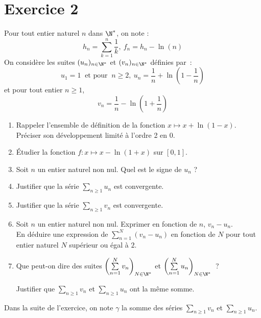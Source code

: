 \documentclass[twoside,french,11pt]{VcCours}
\begin{document}
\section*{Exercice 2}
Pour tout entier naturel $n$ dans $\N^*$, on note :
\[h_n=\sum_{k=1}^n\frac{1}{k},\ f_n=h_n-\ln(n)\]
On considère les suites $(u_n)_{n\in\N^*}$ et $(v_n)_{n\in \N^*}$ définies par~:
$$ u_1=1\ \textrm{ et pour }\ n\geq 2,\ u_n=\frac{1}{n}+\ln \left(1-\frac{1}{n}\right)$$
et pour tout entier $n \geq 1$, 
$$ v_n=\frac{1}{n}-\ln \left(1+\frac{1}{n}\right)$$
\begin{enumerate}
\item Rappeler l'ensemble de définition de la fonction $x\mapsto x+\ln(1-x)$. Préciser son développement limité à l'ordre 2 en 0.
\item Étudier la fonction $f :  x\mapsto x-\ln(1+x)$ sur $[0,1]$.
\item Soit $n$ un entier naturel non nul. Quel est le signe de $u_n$ ? 
\item Justifier que la série $\sum_{n\geq 1} u_n$ est convergente.
\item Justifier que la série $\sum_{n\geq 1} v_n$ est convergente.
\item Soit $n$ un entier naturel non nul. Exprimer en fonction de $n$, $v_n-u_n$.\\
En déduire une expression de $\sum\limits_{n=1}^N(v_n-u_n)$ en fonction de $N$ pour tout entier naturel $N$ supérieur ou égal à $2$.
\item Que peut-on dire des suites $\left(\sum\limits_{n=1}^Nv_n \right)_{N\in \N^*}$ et $\left(\sum\limits_{n=1}^Nu_n\right)_{N\in \N^*}$~? 

Justifier que $\sum\limits_{n\geq 1}v_n$ et $\sum\limits_{n\geq 1}u_n$ ont la même somme.
\end{enumerate}

\medskip

\noindent Dans la suite de l'exercice, on note $\gamma$ la somme des séries $\sum\limits_{n\geq 1}v_n$ et $\sum\limits_{n\geq 1}u_n$.
\end{document}
